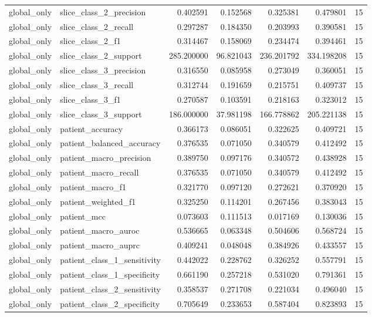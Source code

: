 \begin{tabular}{llrrrrr}
global_only & slice_class_2_precision & 0.402591 & 0.152568 & 0.325381 & 0.479801 & 15 \\
global_only & slice_class_2_recall & 0.297287 & 0.184350 & 0.203993 & 0.390581 & 15 \\
global_only & slice_class_2_f1 & 0.314467 & 0.158069 & 0.234474 & 0.394461 & 15 \\
global_only & slice_class_2_support & 285.200000 & 96.821043 & 236.201792 & 334.198208 & 15 \\
global_only & slice_class_3_precision & 0.316550 & 0.085958 & 0.273049 & 0.360051 & 15 \\
global_only & slice_class_3_recall & 0.312744 & 0.191659 & 0.215751 & 0.409737 & 15 \\
global_only & slice_class_3_f1 & 0.270587 & 0.103591 & 0.218163 & 0.323012 & 15 \\
global_only & slice_class_3_support & 186.000000 & 37.981198 & 166.778862 & 205.221138 & 15 \\
global_only & patient_accuracy & 0.366173 & 0.086051 & 0.322625 & 0.409721 & 15 \\
global_only & patient_balanced_accuracy & 0.376535 & 0.071050 & 0.340579 & 0.412492 & 15 \\
global_only & patient_macro_precision & 0.389750 & 0.097176 & 0.340572 & 0.438928 & 15 \\
global_only & patient_macro_recall & 0.376535 & 0.071050 & 0.340579 & 0.412492 & 15 \\
global_only & patient_macro_f1 & 0.321770 & 0.097120 & 0.272621 & 0.370920 & 15 \\
global_only & patient_weighted_f1 & 0.325250 & 0.114201 & 0.267456 & 0.383043 & 15 \\
global_only & patient_mcc & 0.073603 & 0.111513 & 0.017169 & 0.130036 & 15 \\
global_only & patient_macro_auroc & 0.536665 & 0.063348 & 0.504606 & 0.568724 & 15 \\
global_only & patient_macro_auprc & 0.409241 & 0.048048 & 0.384926 & 0.433557 & 15 \\
global_only & patient_class_1_sensitivity & 0.442022 & 0.228762 & 0.326252 & 0.557791 & 15 \\
global_only & patient_class_1_specificity & 0.661190 & 0.257218 & 0.531020 & 0.791361 & 15 \\
global_only & patient_class_2_sensitivity & 0.358537 & 0.271708 & 0.221034 & 0.496040 & 15 \\
global_only & patient_class_2_specificity & 0.705649 & 0.233653 & 0.587404 & 0.823893 & 15 \\

\end{tabular}

